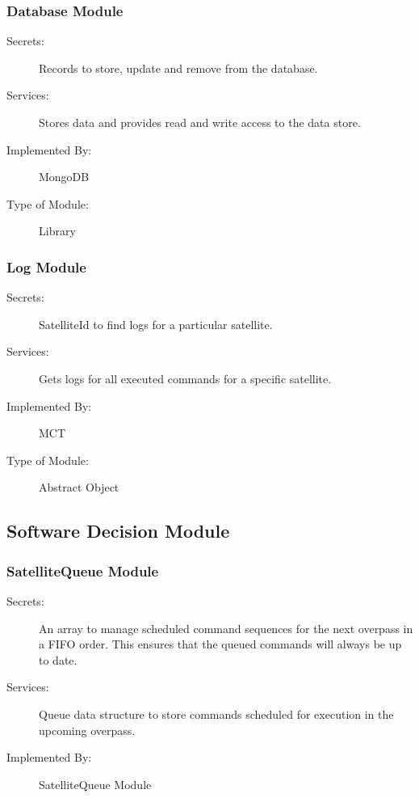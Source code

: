 \documentclass[12pt, titlepage]{article}
\begin{document}
\subsubsection{Database Module }

\begin{description}
\item[Secrets:] Records to store, update and remove from the database.
\item[Services:] Stores data and provides read and write access to the data store.
\item[Implemented By:] MongoDB
\item[Type of Module:] Library
\end{description}

\subsubsection{Log Module }

\begin{description}
\item[Secrets:] SatelliteId to find logs for a particular satellite.
\item[Services:] Gets logs for all executed commands for a specific satellite.
\item[Implemented By:] MCT
\item[Type of Module:] Abstract Object
\end{description}

\subsection{Software Decision Module}

\subsubsection{SatelliteQueue Module}

\begin{description}
\item[Secrets:] An array to manage scheduled command sequences for the next overpass in a FIFO order. This ensures that the queued commands will always be up to date.
\item[Services:] Queue data structure to store commands scheduled for execution in the upcoming overpass.
\item[Implemented By:] SatelliteQueue Module
\end{description}
\end{document}
